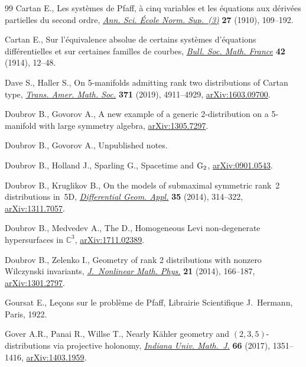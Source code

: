 \documentclass[10pt,a4paper]{amsart}
\numberwithin{equation}{section}
\begin{document}
\begin{thebibliography}{99}
Cartan E., Les syst\`emes de {P}faff, \`a cinq variables et les \'{e}quations
 aux d\'{e}riv\'{e}es partielles du second ordre, \href{https://doi.org/10.24033/asens.618}{\textit{Ann. Sci. \'{E}cole
 Norm. Sup.~(3)}} \textbf{27} (1910), 109--192.

Cartan E., Sur l'\'{e}quivalence absolue de certains syst\`emes d'\'{e}quations
 diff\'{e}rentielles et sur certaines familles de courbes, \href{https://doi.org/10.24033/bsmf.938}{\textit{Bull. Soc.
 Math. France}} \textbf{42} (1914), 12--48.

Dave S., Haller S., On 5-manifolds admitting rank two distributions of {C}artan
 type, \href{https://doi.org/10.1090/tran/7495}{\textit{Trans. Amer. Math. Soc.}} \textbf{371} (2019), 4911--4929,
 \href{https://arxiv.org/abs/1603.09700}{arXiv:1603.09700}.

Doubrov B., Govorov A., A new example of a generic 2-distribution on a
 5-manifold with large symmetry algebra, \href{https://arxiv.org/abs/1305.7297}{arXiv:1305.7297}.

Doubrov B., Govorov A., Unpublished notes.

Doubrov B., Holland J., Sparling G., Spacetime and ${\rm G}_2$,
 \href{https://arxiv.org/abs/0901.0543}{arXiv:0901.0543}.

Doubrov B., Kruglikov B., On the models of submaximal symmetric rank~2
 distributions in~5{D}, \href{https://doi.org/10.1016/j.difgeo.2014.06.008}{\textit{Differential Geom. Appl.}} \textbf{35} (2014),
 314--322, \href{https://arxiv.org/abs/1311.7057}{arXiv:1311.7057}.

Doubrov B., Medvedev A., The D., Homogeneous Levi non-degenerate hypersurfaces
 in ${\mathbb C}^3$, \href{https://arxiv.org/abs/1711.02389}{arXiv:1711.02389}.

Doubrov B., Zelenko I., Geometry of rank 2 distributions with nonzero
 {W}ilczynski invariants, \href{https://doi.org/10.1080/14029251.2014.900985}{\textit{J.~Nonlinear Math. Phys.}} \textbf{21}
 (2014), 166--187, \href{https://arxiv.org/abs/1301.2797}{arXiv:1301.2797}.

Goursat E., Le\c{c}ons sur le probl\`{e}me de {P}faff, Librairie Scientifique
 J.~Hermann, Paris, 1922.

Gover A.R., Panai R., Willse T., Nearly {K}\"{a}hler geometry and
 {$(2,3,5)$}-distributions via projective holonomy, \href{https://doi.org/10.1512/iumj.2017.66.6089}{\textit{Indiana Univ.
 Math.~J.}} \textbf{66} (2017), 1351--1416, \href{https://arxiv.org/abs/1403.1959}{arXiv:1403.1959}.


\end{thebibliography}
\end{document}
